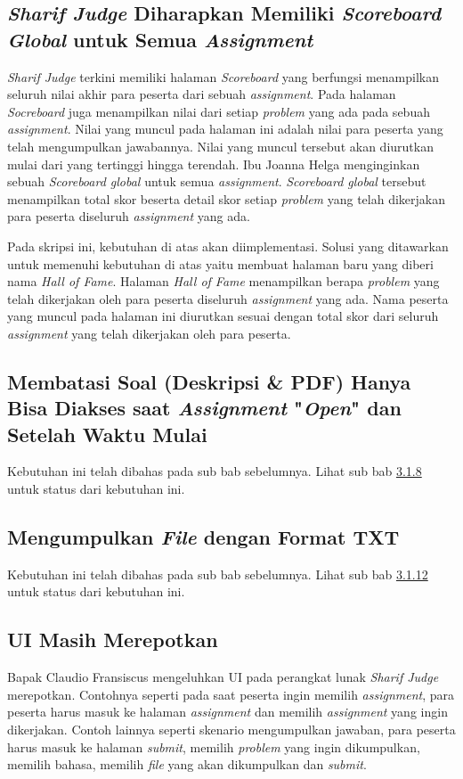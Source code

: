 \subsection{\textit{Sharif Judge} Diharapkan Memiliki \textit{Scoreboard Global} untuk Semua \textit{Assignment}}
\textit{Sharif Judge} terkini memiliki halaman \textit{Scoreboard} yang berfungsi menampilkan seluruh nilai akhir para peserta dari sebuah \textit{assignment}. Pada halaman \textit{Socreboard} juga menampilkan nilai dari setiap \textit{problem} yang ada pada sebuah \textit{assignment}. Nilai yang muncul pada halaman ini adalah nilai para peserta yang telah mengumpulkan jawabannya. Nilai yang muncul tersebut akan diurutkan mulai dari yang tertinggi hingga terendah. Ibu Joanna Helga menginginkan sebuah \textit{Scoreboard global} untuk semua \textit{assignment}. \textit{Scoreboard global} tersebut menampilkan total skor beserta detail skor setiap \textit{problem} yang telah dikerjakan para peserta diseluruh \textit{assignment} yang ada. 

Pada skripsi ini, kebutuhan di atas akan diimplementasi. Solusi yang ditawarkan untuk memenuhi kebutuhan di atas yaitu membuat halaman baru yang diberi nama \textit{Hall of Fame}. Halaman \textit{Hall of Fame} menampilkan berapa \textit{problem} yang telah dikerjakan oleh para peserta diseluruh \textit{assignment} yang ada. Nama peserta yang muncul pada halaman ini diurutkan sesuai dengan total skor dari seluruh \textit{assignment} yang telah dikerjakan oleh para peserta.

\subsection{Membatasi Soal (Deskripsi \& PDF) Hanya Bisa Diakses saat \textit{Assignment} "\textit{Open}" dan Setelah Waktu Mulai}
Kebutuhan ini telah dibahas pada sub bab sebelumnya. Lihat sub bab \hyperref[subsec:membatasisoal]{3.1.8} untuk status dari kebutuhan ini.

\subsection{Mengumpulkan \textit{File} dengan Format TXT}
Kebutuhan ini telah dibahas pada sub bab sebelumnya. Lihat sub bab \hyperref[subsec:filetxt]{3.1.12} untuk status dari kebutuhan ini.

\subsection{UI Masih Merepotkan}
Bapak Claudio Fransiscus mengeluhkan UI pada perangkat lunak \textit{Sharif Judge} merepotkan. Contohnya seperti pada saat peserta ingin memilih \textit{assignment}, para peserta harus masuk ke halaman \textit{assignment} dan memilih \textit{assignment} yang ingin dikerjakan. Contoh lainnya seperti skenario mengumpulkan jawaban, para peserta harus masuk ke halaman \textit{submit}, memilih \textit{problem} yang ingin dikumpulkan, memilih bahasa, memilih \textit{file} yang akan dikumpulkan dan \textit{submit}.

